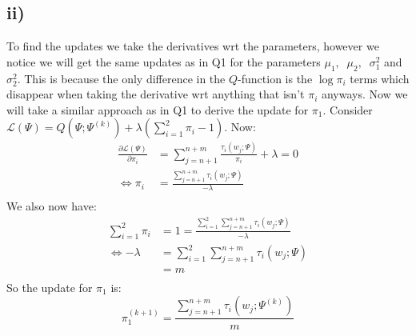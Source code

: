 \documentclass{article}
\begin{document}
\subsection*{ii)}
To find the updates we take the derivatives wrt the parameters, however we notice we will get the same updates as in Q1 for the parameters $\mu_1,\;\;\mu_2,\;\;\sigma_1^2$ and $\sigma_2^2$. This is because the only difference in the $Q$-function is the $\log\pi_i$ terms which disappear when taking the derivative wrt anything that isn't $\pi_i$ anyways. Now we will take a similar approach as in Q1 to derive the update for $\pi_1$. Consider $\mathcal{L}(\Psi)=Q(\Psi;\Psi^{(k)})+\lambda(\sum_{i=1}^{2}\pi_i-1)$. Now:
\begin{align*}
\frac{\partial\mathcal{L}(\Psi)}{\partial\pi_i}&=\sum_{j=n+1}^{n+m}\frac{\tau_{i}(w_j;\Psi)}{\pi_i}+\lambda=0\\
\iff\pi_i&=\frac{\sum_{j=n+1}^{n+m}\tau_{i}(w_j;\Psi)}{-\lambda}\\
\end{align*}
We also now have:
\begin{align*}
\sum_{i=1}^{2}\pi_i&=1=\frac{\sum_{i=1}^{2}\sum_{j=n+1}^{n+m}\tau_{i}(w_j;\Psi)}{-\lambda}\\
\iff-\lambda&=\sum_{i=1}^{2}\sum_{j=n+1}^{n+m}\tau_{i}(w_j;\Psi)\\
&=m\\
\end{align*}
So the update for $\pi_1$ is:
$$\pi_1^{(k+1)}=\frac{\sum_{j=n+1}^{n+m}\tau_{i}(w_j;\Psi^{(k)})}{m}$$
\end{document}
